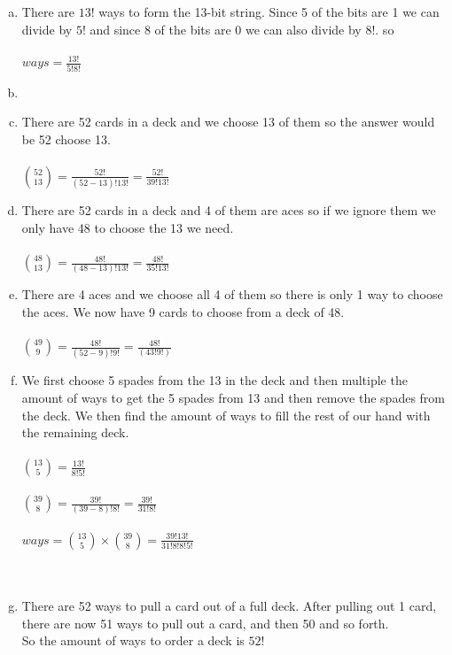 \documentclass[11pt,letterpaper]{article}
\begin{document}
\clearpage
\begin{enumerate}[(a)]
\item
There are $13!$ ways to form the 13-bit string. Since 5 of the bits are 1 we can divide by $5!$ and since 8 of the bits are 0 we can also divide by $8!$.
so\\\\ $ways = \frac{13!}{5!8!}$\\
\item
\item
There are 52 cards in a deck and we choose 13 of them so the answer would be 52 choose 13.\\\\ ${52\choose 13} = \frac{52!}{(52-13)!13!} = \frac{52!}{39!13!}$\\
\item
There are 52 cards in a deck and 4 of them are aces so if we ignore them we only have 48 to choose the 13 we need.\\\\
${48\choose 13} = \frac{48!}{(48-13)!13!} = \frac{48!}{35!13!}$\\
\item
There are 4 aces and we choose all 4 of them so there is only 1 way to choose the aces. We now have 9 cards to choose from a deck of 48.\\\\
${49\choose 9} = \frac{48!}{(52-9)!9!} = \frac{48!}{(43!9!)}$\\
\item
We first choose 5 spades from the 13 in the deck and then multiple the amount of ways to get the 5 spades from 13 and then remove the spades from the deck. We then find the amount of ways to fill the rest of our hand with the remaining deck.\\\\
${13\choose5} = \frac{13!}{8!5!}$\\\\
${39\choose8} = \frac{39!}{(39-8)!8!} = \frac{39!}{31!8!}$\\\\
$ways = {13\choose5}\times {39\choose8} = \frac{39!13!}{31!8!8!5!}$\\\\\
\item
There are 52 ways to pull a card out of a full deck. After pulling out 1 card, there are now 51 ways to pull out a card, and then 50 and so forth.\\
So the amount of ways to order a deck is $52!$\\

\end{enumerate}
\end{document}
